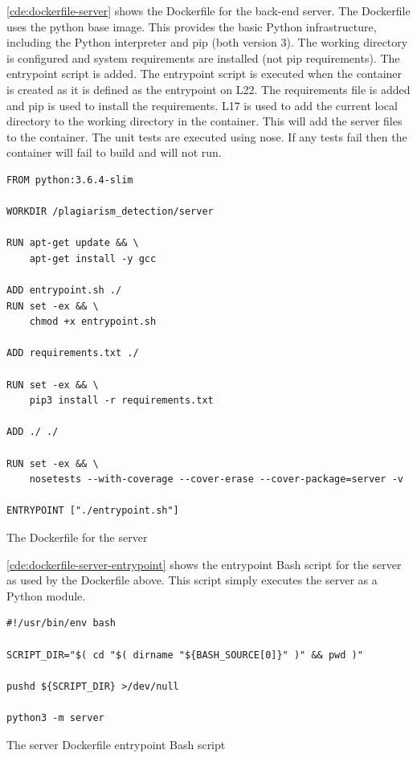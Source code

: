 \autoref{cde:dockerfile-server} shows the Dockerfile for the back-end server. The Dockerfile uses the python base image. This provides the basic Python infrastructure, including the Python interpreter and pip (both version 3). The working directory is configured and system requirements are installed (not pip requirements). The entrypoint script is added. The entrypoint script is executed when the container is created as it is defined as the entrypoint on L22. The requirements file is added and pip is used to install the requirements. L17 is used to add the current local directory to the working directory in the container. This will add the server files to the container. The unit tests are executed using nose. If any tests fail then the container will fail to build and will not run.

\begin{code}
\begin{verbatim}
FROM python:3.6.4-slim

WORKDIR /plagiarism_detection/server

RUN apt-get update && \
    apt-get install -y gcc

ADD entrypoint.sh ./
RUN set -ex && \
    chmod +x entrypoint.sh

ADD requirements.txt ./

RUN set -ex && \
    pip3 install -r requirements.txt

ADD ./ ./

RUN set -ex && \
    nosetests --with-coverage --cover-erase --cover-package=server -v

ENTRYPOINT ["./entrypoint.sh"]
\end{verbatim}
\caption{The Dockerfile for the server}
\label{cde:dockerfile-server}
\end{code}

\autoref{cde:dockerfile-server-entrypoint} shows the entrypoint Bash script for the server as used by the Dockerfile above. This script simply executes the server as a Python module.

\begin{code}
\begin{verbatim}
#!/usr/bin/env bash

SCRIPT_DIR="$( cd "$( dirname "${BASH_SOURCE[0]}" )" && pwd )"

pushd ${SCRIPT_DIR} >/dev/null

python3 -m server
\end{verbatim}
\caption{The server Dockerfile entrypoint Bash script}
\label{cde:dockerfile-server-entrypoint}
\end{code}
